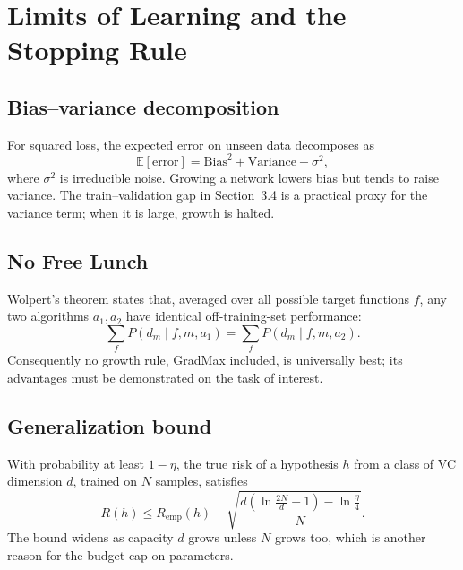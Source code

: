 \documentclass[11pt,a4paper]{article}
\begin{document}
\section{Limits of Learning and the Stopping Rule}\label{sec:limits}
\subsection{Bias--variance decomposition}
For squared loss, the expected error on unseen data decomposes as
\begin{equation}
\mathbb{E}[\text{error}] = \mathrm{Bias}^{2} + \mathrm{Variance} + \sigma^{2},
\end{equation}
where $\sigma^2$ is irreducible noise. Growing a network lowers bias but tends to raise variance. The train--validation gap in Section~3.4 is a practical proxy for the variance term; when it is large, growth is halted.

\subsection{No Free Lunch}
Wolpert's theorem states that, averaged over all possible target functions $f$, any two algorithms $a_1,a_2$ have identical off-training-set performance:
\begin{equation}
\sum_{f} P(d_m\mid f,m,a_1) = \sum_{f} P(d_m\mid f,m,a_2).
\end{equation}
Consequently no growth rule, GradMax included, is universally best; its advantages must be demonstrated on the task of interest.

\subsection{Generalization bound}
With probability at least $1-\eta$, the true risk of a hypothesis $h$ from a class of VC dimension $d$, trained on $N$ samples, satisfies
\begin{equation}
R(h)\le R_{\mathrm{emp}}(h)+\sqrt{\frac{d\left(\ln\frac{2N}{d}+1\right)-\ln\frac{\eta}{4}}{N}}.
\end{equation}
The bound widens as capacity $d$ grows unless $N$ grows too, which is another reason for the budget cap on parameters.
\end{document}
